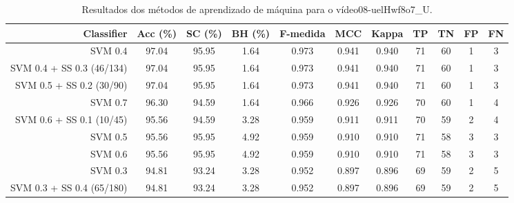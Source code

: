 \begin{table}[!htb]
\centering
\caption{Resultados dos métodos de aprendizado de máquina para o vídeo08-uelHwf8o7_U.}
\label{tab:08-uelHwf8o7_U}
\begin{tabular}{r|c|c|c|c|c|c|c|c|c|c}
\hline\hline
Classifier & Acc (\%) & SC (\%) & BH (\%) & F-medida & MCC & Kappa & TP & TN & FP & FN \\ \hline
SVM 0.4 & 97.04 & 95.95 & 1.64 & 0.973 & 0.941 & 0.940 & 71 & 60 & 1 & 3 \\ 
SVM 0.4 + SS 0.3 (46/134) & 97.04 & 95.95 & 1.64 & 0.973 & 0.941 & 0.940 & 71 & 60 & 1 & 3 \\ 
SVM 0.5 + SS 0.2 (30/90) & 97.04 & 95.95 & 1.64 & 0.973 & 0.941 & 0.940 & 71 & 60 & 1 & 3 \\ 
SVM 0.7 & 96.30 & 94.59 & 1.64 & 0.966 & 0.926 & 0.926 & 70 & 60 & 1 & 4 \\ 
SVM 0.6 + SS 0.1 (10/45) & 95.56 & 94.59 & 3.28 & 0.959 & 0.911 & 0.911 & 70 & 59 & 2 & 4 \\ 
SVM 0.5 & 95.56 & 95.95 & 4.92 & 0.959 & 0.910 & 0.910 & 71 & 58 & 3 & 3 \\ 
SVM 0.6 & 95.56 & 95.95 & 4.92 & 0.959 & 0.910 & 0.910 & 71 & 58 & 3 & 3 \\ 
SVM 0.3 & 94.81 & 93.24 & 3.28 & 0.952 & 0.897 & 0.896 & 69 & 59 & 2 & 5 \\ 
SVM 0.3 + SS 0.4 (65/180) & 94.81 & 93.24 & 3.28 & 0.952 & 0.897 & 0.896 & 69 & 59 & 2 & 5 \\ 
\hline\hline
\end{tabular}
\end{table}
